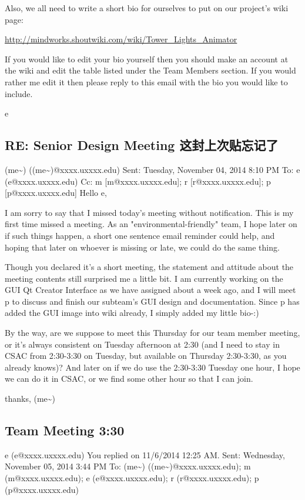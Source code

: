 \documentclass[12pt]{book}
\begin{document}
Also, we all need to write a short bio for ourselves to put on our project's wiki page:

\url{http://mindworks.shoutwiki.com/wiki/Tower_Lights_Animator}

If you would like to edit your bio yourself then you should make an account at the wiki and edit the table listed under the  Team Members section. If you would rather me edit it then please reply to this email with the bio you would like to include. 

e
\subsection{RE: Senior Design Meeting 这封上次贴忘记了}
\label{sec-18-2-2}
(me\textasciitilde{}) ((me\textasciitilde{})@xxxx.uxxxx.edu)
Sent:        Tuesday, November 04, 2014 8:10 PM
To:        
e (e@xxxx.uxxxx.edu)
Cc:        
m [m@xxxx.uxxxx.edu]; r [r@xxxx.uxxxx.edu]; p [p@xxxx.uxxxx.edu]
Hello e, 

I am sorry to say that I missed today's meeting without notification. This is my first time missed a meeting. As an "environmental-friendly" team, I hope later on if such things happen, a short one sentence email reminder could help, and hoping that later on whoever is missing or late, we could do the same thing. 

Though you declared it's a short meeting, the statement and attitude about the meeting contents still surprised me a little bit. I am currently working on the GUI Qt Creator Interface as we have assigned about a week ago, and I will meet p to discuss and finish our subteam's GUI design and documentation. Since p has added the GUI image into wiki already, I simply added my little bio-:)

By the way, are we suppose to meet this Thursday for our team member meeting, or it's always consistent on Tuesday afternoon at 2:30 (and I need to stay in CSAC from 2:30-3:30 on Tuesday, but available on Thursday 2:30-3:30, as you already knows)? And later on if we do use the 2:30-3:30 Tuesday one hour, I hope we can do it in CSAC, or we find some other hour so that I can join. 

thanks,
(me\textasciitilde{})

\subsection{Team Meeting 3:30}
\label{sec-18-2-3}
e (e@xxxx.uxxxx.edu)
You replied on 11/6/2014 12:25 AM.
Sent:        Wednesday, November 05, 2014 3:44 PM
To:        
(me\textasciitilde{}) ((me\textasciitilde{})@xxxx.uxxxx.edu); m (m@xxxx.uxxxx.edu); e (e@xxxx.uxxxx.edu); r (r@xxxx.uxxxx.edu); p (p@xxxx.uxxxx.edu)
\end{document}

